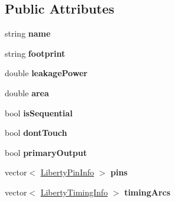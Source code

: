\subsection*{Public Attributes}
\begin{DoxyCompactItemize}
\item 
\hypertarget{structLibertyCellInfo_a50066e7ef4d4110f6751bb9d81079614}{string {\bfseries name}}\label{structLibertyCellInfo_a50066e7ef4d4110f6751bb9d81079614}

\item 
\hypertarget{structLibertyCellInfo_af9b2d1f00a5d75b8e61bf3ce110a2d33}{string {\bfseries footprint}}\label{structLibertyCellInfo_af9b2d1f00a5d75b8e61bf3ce110a2d33}

\item 
\hypertarget{structLibertyCellInfo_a160c15b0dffa8079ec5bd52115f0d6cf}{double {\bfseries leakage\-Power}}\label{structLibertyCellInfo_a160c15b0dffa8079ec5bd52115f0d6cf}

\item 
\hypertarget{structLibertyCellInfo_a9fe14565c391db64fe59b885db703ba2}{double {\bfseries area}}\label{structLibertyCellInfo_a9fe14565c391db64fe59b885db703ba2}

\item 
\hypertarget{structLibertyCellInfo_a7d8643908315b2a90faf453fa475b2ea}{bool {\bfseries is\-Sequential}}\label{structLibertyCellInfo_a7d8643908315b2a90faf453fa475b2ea}

\item 
\hypertarget{structLibertyCellInfo_aad4eed91d5d0ecdda6ade0356ef8e5cf}{bool {\bfseries dont\-Touch}}\label{structLibertyCellInfo_aad4eed91d5d0ecdda6ade0356ef8e5cf}

\item 
\hypertarget{structLibertyCellInfo_a20420db0c6e78453236b10a62478f4e8}{bool {\bfseries primary\-Output}}\label{structLibertyCellInfo_a20420db0c6e78453236b10a62478f4e8}

\item 
\hypertarget{structLibertyCellInfo_a521bb57132e935e3a1db03227dc6345b}{vector$<$ \hyperlink{structLibertyPinInfo}{Liberty\-Pin\-Info} $>$ {\bfseries pins}}\label{structLibertyCellInfo_a521bb57132e935e3a1db03227dc6345b}

\item 
\hypertarget{structLibertyCellInfo_a28e5986b7cbdee33fbed50f4cb54c005}{vector$<$ \hyperlink{structLibertyTimingInfo}{Liberty\-Timing\-Info} $>$ {\bfseries timing\-Arcs}}\label{structLibertyCellInfo_a28e5986b7cbdee33fbed50f4cb54c005}

\end{DoxyCompactItemize}


